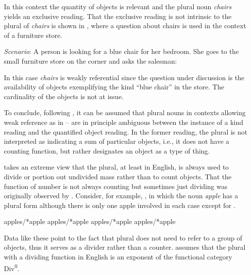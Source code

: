 \documentclass[output=paper,colorlinks,citecolor=brown]{langscibook}
\begin{document}
\noindent In this context the quantity of objects is relevant and the plural noun \textit{chairs} yields an exclusive reading. That the exclusive reading is not intrinsic to the plural of \textit{chairs} is shown in , where a question about chairs is used in the context of a furniture store.


\eanoraggedright\label{ex:geist:13} \textit{Scenario}: A person is looking for a blue chair for her bedroom. She goes to the small 	furniture store on the corner and asks the salesman:
\begin{xlist}
\label{ex:geist:13A:}
\label{ex:geist:13B:}
\end{xlist}
\z

\noindent In this case \textit{chairs} is weakly referential since the question under discussion is the availability of objects exemplifying the kind ``blue chair'' in the store. The cardinality of the objects is not at issue.

To conclude, following \citet{Grimm2013}, it can be assumed that plural nouns in contexts allowing weak reference as in -- are in principle ambiguous between the instance of a kind reading and the quantified object reading. In the former reading, the plural is not interpreted as indicating a sum of particular objects, i.e., it does not have a counting function, but rather designates an object as a type of thing.

\citet{Borer2005} takes an extreme view that the plural, at least in English, is always used to divide or portion out undivided mass rather than to count objects. That the function of number is not always counting but sometimes just dividing was originally observed by \citet{Krifka1989}. Consider, for example, , in which the noun \textit{apple} has a plural form although there is only one apple involved in each case except for .

\ea\label{ex:geist:14}
 apples/*apple
\label{ex:geist:14a}
 apples/*apple
\label{ex:geist:14b}
 apples/*apple
\label{ex:geist:14c}
 apples/*apple \hfill \citep[115]{Borer2005} 
\label{ex:geist:14d}
\z\z

\noindent Data like these point to the fact that plural does not need to refer to a group of objects, thus it serves as a divider rather than a counter. \citet{Borer2005} assumes that the plural with a dividing function in English is an exponent of the functional category Div\textsuperscript{0}. 
\end{document}
